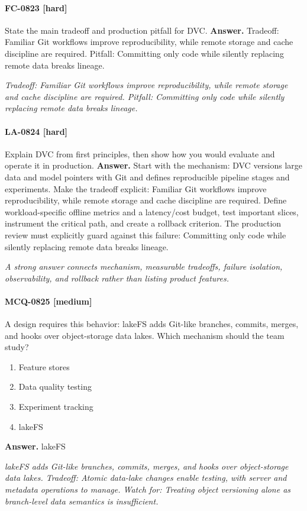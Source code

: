 \paragraph{FC-0823 [hard]} State the main tradeoff and production pitfall for DVC.
\noindent\textbf{Answer.} Tradeoff: Familiar Git workflows improve reproducibility, while remote storage and cache discipline are required. Pitfall: Committing only code while silently replacing remote data breaks lineage.
\par\textit{Tradeoff: Familiar Git workflows improve reproducibility, while remote storage and cache discipline are required. Pitfall: Committing only code while silently replacing remote data breaks lineage.}
\paragraph{LA-0824 [hard]} Explain DVC from first principles, then show how you would evaluate and operate it in production.
\noindent\textbf{Answer.} Start with the mechanism: DVC versions large data and model pointers with Git and defines reproducible pipeline stages and experiments. Make the tradeoff explicit: Familiar Git workflows improve reproducibility, while remote storage and cache discipline are required. Define workload-specific offline metrics and a latency/cost budget, test important slices, instrument the critical path, and create a rollback criterion. The production review must explicitly guard against this failure: Committing only code while silently replacing remote data breaks lineage.
\par\textit{A strong answer connects mechanism, measurable tradeoffs, failure isolation, observability, and rollback rather than listing product features.}
\paragraph{MCQ-0825 [medium]} A design requires this behavior: lakeFS adds Git-like branches, commits, merges, and hooks over object-storage data lakes. Which mechanism should the team study?
\begin{enumerate}[label=\Alph*.]
\item Feature stores
\item Data quality testing
\item Experiment tracking
\item lakeFS
\end{enumerate}
\noindent\textbf{Answer.} lakeFS
\par\textit{lakeFS adds Git-like branches, commits, merges, and hooks over object-storage data lakes. Tradeoff: Atomic data-lake changes enable testing, with server and metadata operations to manage. Watch for: Treating object versioning alone as branch-level data semantics is insufficient.}
